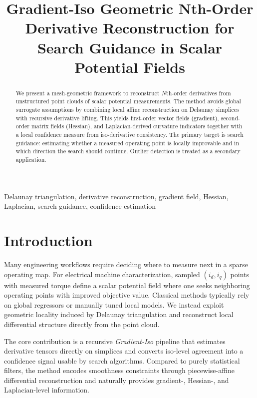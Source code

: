 ﻿\documentclass[conference]{IEEEtran}
\title{Gradient-Iso Geometric Nth-Order Derivative Reconstruction for Search Guidance in Scalar Potential Fields}
\author{\IEEEauthorblockN{Raphael Keller and Collaborators}
\IEEEauthorblockA{Independent Research Project\\
Email: placeholder@example.com}}
\begin{document}
\maketitle

\begin{abstract}
We present a mesh-geometric framework to reconstruct $N$th-order derivatives from unstructured point clouds of scalar potential measurements. The method avoids global surrogate assumptions by combining local affine reconstruction on Delaunay simplices with recursive derivative lifting. This yields first-order vector fields (gradient), second-order matrix fields (Hessian), and Laplacian-derived curvature indicators together with a local confidence measure from iso-derivative consistency. The primary target is search guidance: estimating whether a measured operating point is locally improvable and in which direction the search should continue. Outlier detection is treated as a secondary application.
\end{abstract}

\begin{IEEEkeywords}
Delaunay triangulation, derivative reconstruction, gradient field, Hessian, Laplacian, search guidance, confidence estimation
\end{IEEEkeywords}

\section{Introduction}
Many engineering workflows require deciding where to measure next in a sparse operating map. For electrical machine characterization, sampled $(i_d,i_q)$ points with measured torque define a scalar potential field where one seeks neighboring operating points with improved objective value. Classical methods typically rely on global regressors or manually tuned local models. We instead exploit geometric locality induced by Delaunay triangulation \cite{delaunay1934,edelsbrunner2001} and reconstruct local differential structure directly from the point cloud.

The core contribution is a recursive \emph{Gradient-Iso} pipeline that estimates derivative tensors directly on simplices and converts iso-level agreement into a confidence signal usable by search algorithms. Compared to purely statistical filters, the method encodes smoothness constraints through piecewise-affine differential reconstruction and naturally provides gradient-, Hessian-, and Laplacian-level information.
\end{document}
